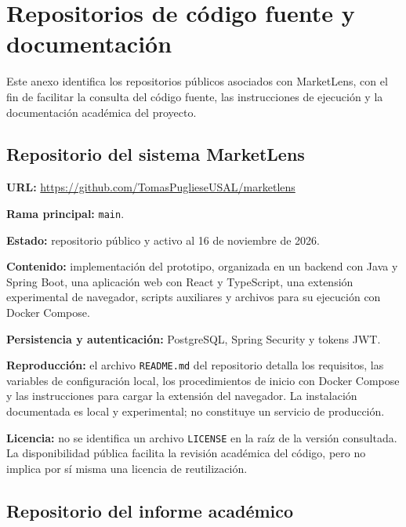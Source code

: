 
\chapter{Repositorios de código fuente y documentación}
\label{anx:repositorios}

Este anexo identifica los repositorios públicos asociados con MarketLens,
con el fin de facilitar la consulta del código fuente, las instrucciones
de ejecución y la documentación académica del proyecto.

\section{Repositorio del sistema MarketLens}
\label{anx:repositorio-software}

\noindent\textbf{URL:}
\url{https://github.com/TomasPuglieseUSAL/marketlens}

\noindent\textbf{Rama principal:} \texttt{main}.

\noindent\textbf{Estado:} repositorio público y activo al
16 de noviembre de 2026.

\noindent\textbf{Contenido:} implementación del prototipo,
organizada en un backend con Java y Spring Boot, una aplicación web
con React y TypeScript, una extensión experimental de navegador,
scripts auxiliares y archivos para su ejecución con Docker Compose.

\noindent\textbf{Persistencia y autenticación:}
PostgreSQL, Spring Security y tokens JWT.

\noindent\textbf{Reproducción:} el archivo \texttt{README.md} del
repositorio detalla los requisitos, las variables de configuración
local, los procedimientos de inicio con Docker Compose y las
instrucciones para cargar la extensión del navegador.
La instalación documentada es local y experimental; no constituye
un servicio de producción.

\noindent\textbf{Licencia:} no se identifica un archivo
\texttt{LICENSE} en la raíz de la versión consultada. La
disponibilidad pública facilita la revisión académica del código,
pero no implica por sí misma una licencia de reutilización.

\section{Repositorio del informe académico}
\label{anx:repositorio-documentacion}

